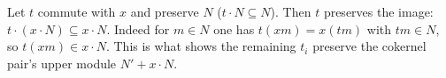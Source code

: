 \begin{lemma}\label{mk-lem:graded_map_map_le_of_commute}
  \leanok

  Let \(t\) commute with \(x\) and preserve \(N\) (\(t \cdot N \subseteq N\)). Then
  \(t\) preserves the image: \(t \cdot (x \cdot N) \subseteq x \cdot N\). Indeed for
  \(m \in N\) one has \(t(x m) = x(t m)\) with \(t m \in N\), so \(t(x m) \in x \cdot
  N\). This is what shows the remaining \(t_i\) preserve the cokernel pair's upper
  module \(N' + x \cdot N\).
\end{lemma}

\begin{lemma}\label{mk-lem:graded_subquotient_ker_coker}
  \leanok


\end{lemma}
